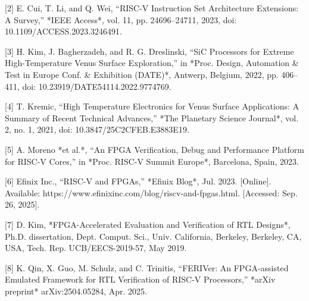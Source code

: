 \documentclass[10pt,twocolumn]{article}
\begin{document}
[2] E. Cui, T. Li, and Q. Wei, “RISC-V Instruction Set Architecture Extensions: A Survey,” *IEEE Access*, vol. 11, pp. 24696–24711, 2023, doi: 10.1109/ACCESS.2023.3246491.  

[3] H. Kim, J. Bagherzadeh, and R. G. Dreslinski, “SiC Processors for Extreme High-Temperature Venus Surface Exploration,” in *Proc. Design, Automation \& Test in Europe Conf. \& Exhibition (DATE)*, Antwerp, Belgium, 2022, pp. 406–411, doi: 10.23919/DATE54114.2022.9774769.  

[4] T. Kremic, “High Temperature Electronics for Venus Surface Applications: A Summary of Recent Technical Advances,” *The Planetary Science Journal*, vol. 2, no. 1, 2021, doi: 10.3847/25C2CFEB.E3883E19.  

[5] A. Moreno *et al.*, “An FPGA Verification, Debug and Performance Platform for RISC-V Cores,” in *Proc. RISC-V Summit Europe*, Barcelona, Spain, 2023.  

[6] Efinix Inc., “RISC-V and FPGAs,” *Efinix Blog*, Jul. 2023. [Online]. Available: https://www.efinixinc.com/blog/riscv-and-fpgas.html. [Accessed: Sep. 26, 2025].  

[7] D. Kim, *FPGA-Accelerated Evaluation and Verification of RTL Designs*, Ph.D. dissertation, Dept. Comput. Sci., Univ. California, Berkeley, Berkeley, CA, USA, Tech. Rep. UCB/EECS-2019-57, May 2019.  

[8] K. Qin, X. Guo, M. Schulz, and C. Trinitis, “FERIVer: An FPGA-assisted Emulated Framework for RTL Verification of RISC-V Processors,” *arXiv preprint* arXiv:2504.05284, Apr. 2025.  
\end{document}
